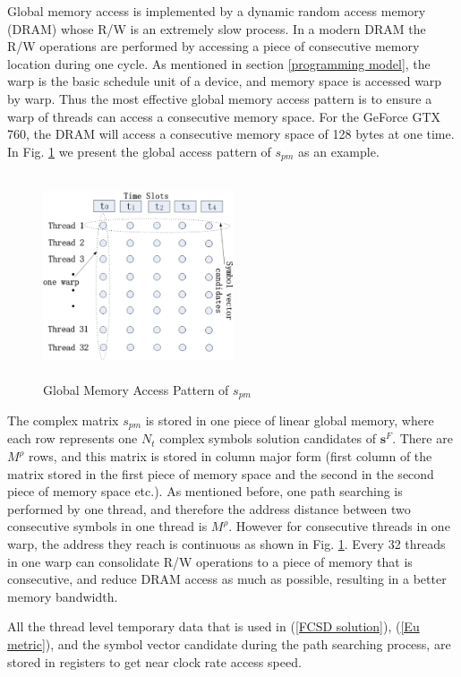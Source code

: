 \documentclass[letterpaper, 10pt, conference, twoside]{ieeeconf}
\begin{document}
Global memory access is implemented by a dynamic random access memory (DRAM) whose R/W is an extremely slow process. In a modern DRAM the R/W operations are performed by accessing a piece of consecutive memory location during one cycle. As mentioned in section \ref{programming model}, the warp is the basic schedule unit of a device, and memory space is accessed warp by warp. Thus the most effective global memory access pattern is to ensure a warp of threads can access a consecutive memory space. For the GeForce GTX 760, the DRAM will access a consecutive memory space of 128 bytes at one time. In Fig. \ref{coalesce global memory} we present the global access pattern of $\mathit{s_{pm}}$ as an example.
\begin{figure}[htb]
\centering
\includegraphics[width=0.5\textwidth, height=6cm]{coalescing_global_memory.eps}
\caption{Global Memory Access Pattern of $\mathit{s_{pm}}$}
\label{coalesce global memory}
\end{figure}


The complex matrix $\mathit{s_{pm}}$ is stored in one piece of linear global memory, where each row represents one $N_{t}$ complex symbols solution candidates of $\mathbf{s}^{F}$. There are $M^{\rho}$ rows, and this matrix is stored in column major form (first column of the matrix stored in the first piece of memory space and the second in the second piece of memory space etc.). As mentioned before, one path searching is performed by one thread, and therefore the address distance between two consecutive symbols in one thread is $M^{\rho}$. However for consecutive threads in one warp, the address they reach is continuous as shown in Fig. \ref{coalesce global memory}. Every 32 threads in one warp can consolidate R/W operations to a piece of memory that is consecutive, and reduce DRAM access as much as possible, resulting in a better memory bandwidth.

All the thread level temporary data that is used in (\ref{FCSD solution}), (\ref{Eu metric}), and the symbol vector candidate during the path searching process, are stored in registers to get near clock rate access speed.   
\end{document}

